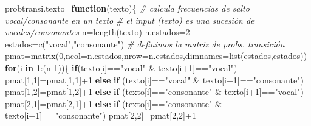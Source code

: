 \documentclass[
]{book}
\newenvironment{Shaded}{\begin{snugshade}}{\end{snugshade}}
\newcommand{\AttributeTok}[1]{\textcolor[rgb]{0.77,0.63,0.00}{#1}}
\newcommand{\CommentTok}[1]{\textcolor[rgb]{0.56,0.35,0.01}{\textit{#1}}}
\newcommand{\ControlFlowTok}[1]{\textcolor[rgb]{0.13,0.29,0.53}{\textbf{#1}}}
\newcommand{\DecValTok}[1]{\textcolor[rgb]{0.00,0.00,0.81}{#1}}
\newcommand{\FunctionTok}[1]{\textcolor[rgb]{0.00,0.00,0.00}{#1}}
\newcommand{\NormalTok}[1]{#1}
\newcommand{\OtherTok}[1]{\textcolor[rgb]{0.56,0.35,0.01}{#1}}
\newcommand{\SpecialCharTok}[1]{\textcolor[rgb]{0.00,0.00,0.00}{#1}}
\newcommand{\StringTok}[1]{\textcolor[rgb]{0.31,0.60,0.02}{#1}}
\theoremstyle{definition}
\theoremstyle{definition}
\theoremstyle{definition}
\theoremstyle{definition}
\theoremstyle{remark}
\begin{document}
\begin{Shaded}
\begin{Highlighting}[]
\NormalTok{probtransi.texto}\OtherTok{=}\ControlFlowTok{function}\NormalTok{(texto)\{}
 \CommentTok{\# calcula frecuencias de salto vocal/consonante en un texto}
  \CommentTok{\# el input (texto) es una sucesión de vocales/consonantes}
\NormalTok{n}\OtherTok{=}\FunctionTok{length}\NormalTok{(texto)}
\NormalTok{n.estados}\OtherTok{=}\DecValTok{2}
\NormalTok{estados}\OtherTok{=}\FunctionTok{c}\NormalTok{(}\StringTok{"vocal"}\NormalTok{,}\StringTok{"consonante"}\NormalTok{)}
\CommentTok{\# definimos la matriz de probs. transición}
\NormalTok{pmat}\OtherTok{=}\FunctionTok{matrix}\NormalTok{(}\DecValTok{0}\NormalTok{,}\AttributeTok{ncol=}\NormalTok{n.estados,}\AttributeTok{nrow=}\NormalTok{n.estados,}\AttributeTok{dimnames=}\FunctionTok{list}\NormalTok{(estados,estados))}
\ControlFlowTok{for}\NormalTok{(i }\ControlFlowTok{in} \DecValTok{1}\SpecialCharTok{:}\NormalTok{(n}\DecValTok{{-}1}\NormalTok{))\{}
  \ControlFlowTok{if}\NormalTok{(texto[i]}\SpecialCharTok{==}\StringTok{"vocal"} \SpecialCharTok{\&}\NormalTok{ texto[i}\SpecialCharTok{+}\DecValTok{1}\NormalTok{]}\SpecialCharTok{==}\StringTok{"vocal"}\NormalTok{)}
\NormalTok{    pmat[}\DecValTok{1}\NormalTok{,}\DecValTok{1}\NormalTok{]}\OtherTok{=}\NormalTok{pmat[}\DecValTok{1}\NormalTok{,}\DecValTok{1}\NormalTok{]}\SpecialCharTok{+}\DecValTok{1}
  \ControlFlowTok{else} \ControlFlowTok{if}\NormalTok{ (texto[i]}\SpecialCharTok{==}\StringTok{"vocal"} \SpecialCharTok{\&}\NormalTok{ texto[i}\SpecialCharTok{+}\DecValTok{1}\NormalTok{]}\SpecialCharTok{==}\StringTok{"consonante"}\NormalTok{)}
\NormalTok{    pmat[}\DecValTok{1}\NormalTok{,}\DecValTok{2}\NormalTok{]}\OtherTok{=}\NormalTok{pmat[}\DecValTok{1}\NormalTok{,}\DecValTok{2}\NormalTok{]}\SpecialCharTok{+}\DecValTok{1}  
  \ControlFlowTok{else} \ControlFlowTok{if}\NormalTok{ (texto[i]}\SpecialCharTok{==}\StringTok{"consonante"} \SpecialCharTok{\&}\NormalTok{ texto[i}\SpecialCharTok{+}\DecValTok{1}\NormalTok{]}\SpecialCharTok{==}\StringTok{"vocal"}\NormalTok{)}
\NormalTok{    pmat[}\DecValTok{2}\NormalTok{,}\DecValTok{1}\NormalTok{]}\OtherTok{=}\NormalTok{pmat[}\DecValTok{2}\NormalTok{,}\DecValTok{1}\NormalTok{]}\SpecialCharTok{+}\DecValTok{1}
  \ControlFlowTok{else} \ControlFlowTok{if}\NormalTok{ (texto[i]}\SpecialCharTok{==}\StringTok{"consonante"} \SpecialCharTok{\&}\NormalTok{ texto[i}\SpecialCharTok{+}\DecValTok{1}\NormalTok{]}\SpecialCharTok{==}\StringTok{"consonante"}\NormalTok{)}
\NormalTok{    pmat[}\DecValTok{2}\NormalTok{,}\DecValTok{2}\NormalTok{]}\OtherTok{=}\NormalTok{pmat[}\DecValTok{2}\NormalTok{,}\DecValTok{2}\NormalTok{]}\SpecialCharTok{+}\DecValTok{1}

\end{Highlighting}
\end{Shaded}
\end{document}
